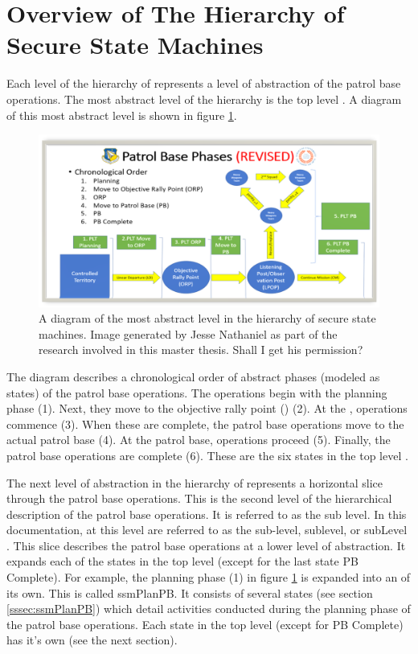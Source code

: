 \documentclass[../../main/main.tex]{subfiles}
\begin{document}
\section{Overview of The Hierarchy of Secure State Machines}\label{sec:overview}

Each level of the hierarchy of  represents a level of abstraction of the patrol base operations. The most abstract level of the hierarchy is the top level .  A diagram of this most abstract level is shown in figure \ref{pbtoplevel}.

\begin{figure}[h]
\includegraphics[width=\textwidth]{../figures/pbtoplevel}
\caption{\label{pbtoplevel}A diagram of the most abstract level in the hierarchy of secure state machines.  Image generated by Jesse Nathaniel as part of the research involved in this master thesis.  Shall I get his permission?}
\end{figure}

The diagram describes a chronological order of abstract phases (modeled as states) of the patrol base operations.  The operations begin with the planning phase (1).  Next, they move to the objective rally point () (2). At the , operations commence (3).  When these are complete, the patrol base operations move to the actual patrol base (4).  At the patrol base, operations proceed (5).  Finally, the patrol base operations are complete (6).  These are the six states in the top level .


The next level of abstraction in the hierarchy of  represents a horizontal slice through the patrol base operations.  This is the second level of the hierarchical description of the patrol base operations. It is referred to as the sub level.  In this documentation,  at this level are referred to as the sub-level, sublevel, or subLevel . This slice describes the patrol base operations at a lower level of abstraction.  It expands each of the states in the top level (except for the last state PB Complete).  For example, the planning phase (1) in figure \ref{pbtoplevel} is expanded into an  of its own.  This is called ssmPlanPB.  It consists of several states (see section \ref{sssec:ssmPlanPB}) which detail activities conducted during the planning phase of the patrol base operations.  Each state in the top level (except for PB Complete) has it's own  (see the next section).
\end{document}
